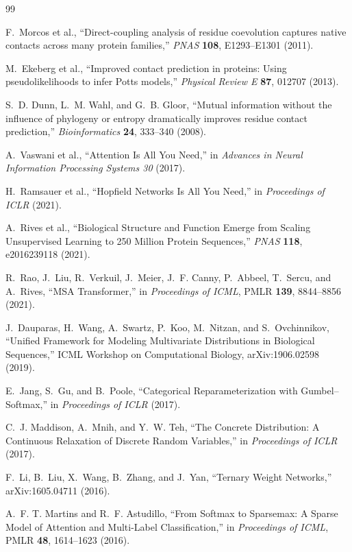 \documentclass[10pt,twocolumn]{article}
\newcommand{\1}{\mathbf 1}
\theoremstyle{remark}
\begin{document}
\begin{thebibliography}{99}

F.~Morcos et al., ``Direct-coupling analysis of residue coevolution captures native contacts
across many protein families,'' \emph{PNAS} \textbf{108}, E1293--E1301 (2011).

M.~Ekeberg et al., ``Improved contact prediction in proteins: Using pseudolikelihoods to infer
Potts models,'' \emph{Physical Review E} \textbf{87}, 012707 (2013).

S.~D. Dunn, L.~M. Wahl, and G.~B. Gloor, ``Mutual information without the influence of phylogeny or
entropy dramatically improves residue contact prediction,'' \emph{Bioinformatics} \textbf{24},
333--340 (2008).

A.~Vaswani et al., ``Attention Is All You Need,'' in \emph{Advances in Neural Information
Processing Systems 30} (2017).

H.~Ramsauer et al., ``Hopfield Networks Is All You Need,'' in \emph{Proceedings of ICLR} (2021).

A.~Rives et al., ``Biological Structure and Function Emerge from Scaling Unsupervised Learning to
250 Million Protein Sequences,'' \emph{PNAS} \textbf{118}, e2016239118 (2021).

R.~Rao, J.~Liu, R.~Verkuil, J.~Meier, J.~F. Canny, P.~Abbeel, T.~Sercu, and A.~Rives,
``MSA Transformer,'' in \emph{Proceedings of ICML}, PMLR \textbf{139}, 8844--8856 (2021).

J.~Dauparas, H.~Wang, A.~Swartz, P.~Koo, M.~Nitzan, and S.~Ovchinnikov,
``Unified Framework for Modeling Multivariate Distributions in Biological Sequences,''
ICML Workshop on Computational Biology, arXiv:1906.02598 (2019).

E.~Jang, S.~Gu, and B.~Poole, ``Categorical Reparameterization with Gumbel--Softmax,'' in
\emph{Proceedings of ICLR} (2017).

C.~J. Maddison, A.~Mnih, and Y.~W. Teh, ``The Concrete Distribution: A Continuous Relaxation of
Discrete Random Variables,'' in \emph{Proceedings of ICLR} (2017).

F.~Li, B.~Liu, X.~Wang, B.~Zhang, and J.~Yan, ``Ternary Weight Networks,''
arXiv:1605.04711 (2016).

A.~F. T. Martins and R.~F. Astudillo, ``From Softmax to Sparsemax: A Sparse Model of Attention and
Multi-Label Classification,'' in \emph{Proceedings of ICML}, PMLR \textbf{48}, 1614--1623 (2016).


\end{thebibliography}
\end{document}
